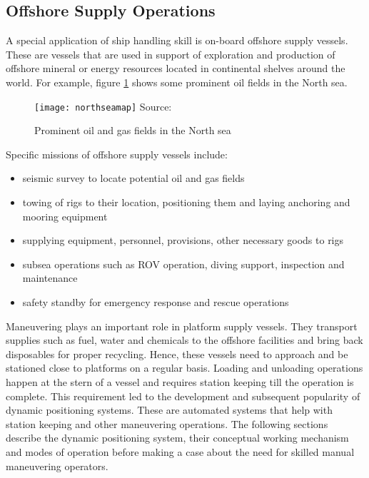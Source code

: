 \subsection{Offshore Supply Operations}

A special application of ship handling skill is on-board offshore supply vessels. These are vessels that are used in support of exploration and production of offshore mineral or energy resources located in continental shelves around the world. For example, figure \ref{fig:northseamap} shows some prominent oil fields in the North sea. 
\begin{figure}
	\centering
	\caption{Prominent oil and gas fields in the North sea}
	\texttt{[image: northseamap]}
	\label{fig:northseamap}
	\hbox{\small Source: }
\end{figure}
Specific missions of offshore supply vessels include: 
\begin{itemize}
\item seismic survey to locate potential oil and gas fields
\item towing of rigs to their location, positioning them and laying anchoring and mooring equipment
\item supplying equipment, personnel, provisions, other necessary goods to rigs
\item subsea operations such as ROV operation, diving support, inspection and maintenance
\item safety standby for emergency response and rescue operations
\end{itemize}


Maneuvering plays an important role in platform supply vessels. They transport supplies such as fuel, water and chemicals to the offshore facilities and bring back disposables for proper recycling. Hence, these vessels need to approach and be stationed close to platforms on a regular basis. Loading and unloading operations happen at the stern of a vessel and requires station keeping till the operation is complete. This requirement led to the development and subsequent popularity of dynamic positioning systems. These are automated systems that help with station keeping and other maneuvering operations. The following sections describe the dynamic positioning system, their conceptual working mechanism and modes of operation before making a case about the need for skilled manual maneuvering operators.
 

